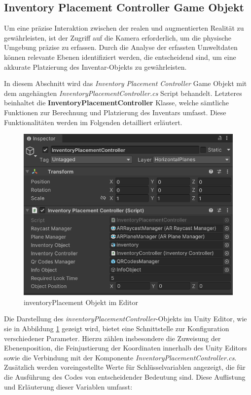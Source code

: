 \subsection{Inventory Placement Controller Game Objekt}
Um eine präzise Interaktion zwischen der realen und augmentierten Realität zu gewährleisten, ist der Zugriff auf die Kamera
erforderlich, um die physische Umgebung präzise zu erfassen. Durch die Analyse der erfassten Umweltdaten können relevante
Ebenen identifiziert werden, die entscheidend sind, um eine akkurate Platzierung des Inventar-Objekts zu gewährleisten.

In diesem Abschnitt wird das \textit{Inventory Placement Controller} Game Objekt mit dem angehängten
\textit{InventoryPlacementController.cs} Script behandelt. Letzteres beinhaltet die \textbf{InventoryPlacementController}
Klasse, welche sämtliche Funktionen zur Berechnung und Platzierung des Inventars umfasst. Diese Funktionalitäten werden
im Folgenden detailliert erläutert.

\begin{figure}[h]
    \centering
    \includegraphics[scale=0.8]{images/invPlace_Editor}
    \caption{inventoryPlacement Objekt im Editor}
    \label{fig:inventoryPlacementController_Editor}
\end{figure}

Die Darstellung des \textit{inventoryPlacementController}-Objekts im Unity Editor, wie sie in
Abbildung \ref{fig:inventoryPlacementController_Editor} gezeigt wird, bietet eine Schnittstelle zur Konfiguration
verschiedener Parameter. Hierzu zählen insbesondere die Zuweisung der Ebenenposition, die Feinjustierung der Koordinaten
innerhalb des Unity Editors sowie die Verbindung mit der Komponente \textit{InventoryPlacementController.cs}. Zusätzlich
werden voreingestellte Werte für Schlüsselvariablen angezeigt, die für die Ausführung des Codes von entscheidender Bedeutung
sind. Diese Auflistung und Erläuterung dieser Variablen umfasst:

